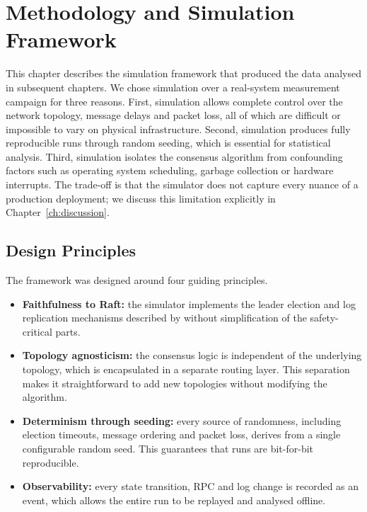 \chapter{Methodology and Simulation Framework}
\label{ch:methodology}

This chapter describes the simulation framework that produced the data analysed in subsequent chapters. We chose simulation over a real-system measurement campaign for three reasons. First, simulation allows complete control over the network topology, message delays and packet loss, all of which are difficult or impossible to vary on physical infrastructure. Second, simulation produces fully reproducible runs through random seeding, which is essential for statistical analysis. Third, simulation isolates the consensus algorithm from confounding factors such as operating system scheduling, garbage collection or hardware interrupts. The trade-off is that the simulator does not capture every nuance of a production deployment; we discuss this limitation explicitly in Chapter~\ref{ch:discussion}.

\section{Design Principles}

The framework was designed around four guiding principles.

\begin{itemize}
    \item \textbf{Faithfulness to Raft:} the simulator implements the leader election and log replication mechanisms described by \citet{ongaro2014} without simplification of the safety-critical parts.
    \item \textbf{Topology agnosticism:} the consensus logic is independent of the underlying topology, which is encapsulated in a separate routing layer. This separation makes it straightforward to add new topologies without modifying the algorithm.
    \item \textbf{Determinism through seeding:} every source of randomness, including election timeouts, message ordering and packet loss, derives from a single configurable random seed. This guarantees that runs are bit-for-bit reproducible.
    \item \textbf{Observability:} every state transition, RPC and log change is recorded as an event, which allows the entire run to be replayed and analysed offline.
\end{itemize}

